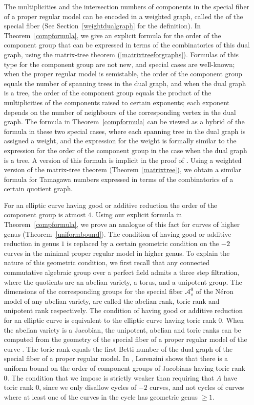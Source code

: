 The multiplicities and the intersection numbers of components in the special fiber of a proper regular model can be encoded in a weighted graph, called the {} of the special fiber (See Section~\ref{weightdualgraph} for the definition). In Theorem~\ref{compformula}, we give an explicit formula for the order of the component group that can be expressed in terms of the combinatorics of this dual graph, using the matrix-tree theorem (\ref{matrixtreeforgraphs}). Formulas of this type for the component group are not new, and special cases are well-known; when the proper regular model is semistable, the order of the component group equals the number of spanning trees in the dual graph, and when the dual graph is a tree, the order of the component group equals the product of the multiplicities of the components raised to certain exponents; each exponent depends on the number of neighbours of the corresponding vertex in the dual graph. The formula in Theorem~\ref{compformula} can be viewed as a hybrid of the formula in these two special cases, where each spanning tree in the dual graph is assigned a weight, and the expression for the weight is formally similar to the expression for the order of the component group in the case when the dual graph is a tree. A version of this formula is implicit in the proof of \cite[Corollary~3.5]{lor1}. Using a weighted version of the matrix-tree theorem (Theorem~\ref{matrixtree}), we obtain a similar formula for Tamagawa numbers expressed in terms of the combinatorics of a certain quotient graph.

For an elliptic curve having good or additive reduction the order of the component group is atmost $4$. Using our explicit formula in Theorem~\ref{compformula}, we prove an analogue of this fact for curves of higher genus (Theorem~\ref{uniformbound}). The condition of having good or additive reduction in genus $1$ is replaced by a certain geometric condition on the $-2$ curves in the minimal proper regular model in higher genus. To explain the nature of this geometric condition, we first recall that any connected commutative algebraic group over a perfect field admits a three step filtration, where the quotients are an abelian variety, a torus, and a unipotent group. The dimensions of the corresponding groups for the special fiber $\mathcal{A}_s^0$ of the N\'{e}ron model of any abelian variety, are called the abelian rank, toric rank and unipotent rank respectively. The condition of having good or additive reduction for an elliptic curve is equivalent to the elliptic curve having toric rank $0$. When the abelian variety is a Jacobian, the unipotent, abelian and toric ranks can be computed from the geometry of the special fiber of a proper regular model of the curve \cite[p.148]{lor}. The toric rank equals the first Betti number of the dual graph of the special fiber of a proper regular model. In \cite{lor}, Lorenzini shows that there is a uniform bound on the order of component groups of Jacobians having toric rank $0$. The condition that we impose is strictly weaker than requiring that $A$ have toric rank $0$, since we only disallow cycles of $-2$ curves, and not cycles of curves where at least one of the curves in the cycle has geometric genus $\geq 1$. 

